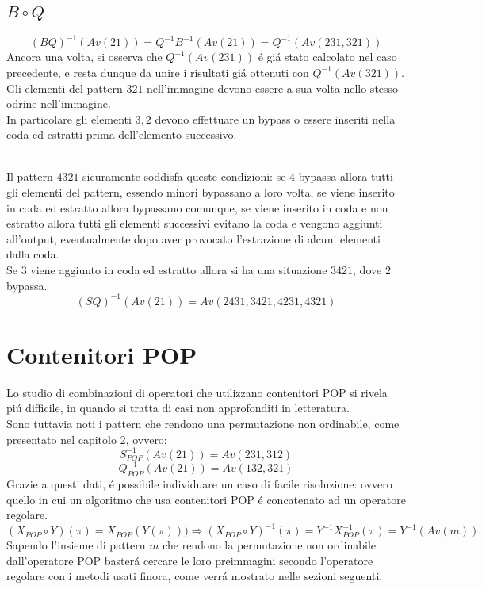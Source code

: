 \subsection*{$B\circ{Q}$}$$(BQ)^{-1}(Av(21))=Q^{-1}B^{-1}(Av(21))=Q^{-1}(Av(231,321))$$
Ancora una volta, si osserva che $Q^{-1}(Av(231))$ \'e gi\'a stato calcolato nel caso precedente, e resta dunque da unire i risultati gi\'a ottenuti con $Q^{-1}(Av(321))$.\\
Gli elementi del pattern $321$ nell'immagine devono essere a sua volta nello stesso odrine nell'immagine.\\
In particolare gli elementi $3,2$ devono effettuare un bypass o essere inseriti nella coda ed estratti prima dell'elemento successivo.\\\\
\begin{center}
\end{center}
Il pattern $4321$ sicuramente soddisfa queste condizioni: se $4$ bypassa allora tutti gli elementi del pattern, essendo minori bypassano a loro volta, se viene inserito in coda ed estratto allora bypassano comunque, se viene inserito in coda e non estratto allora tutti gli elementi successivi evitano la coda e vengono aggiunti all'output, eventualmente dopo aver provocato l'estrazione di alcuni elementi dalla coda.\\
Se $3$ viene aggiunto in coda ed estratto allora si ha una situazione $3421$, dove $2$ bypassa.\\
$$(SQ)^{-1}(Av(21))=Av(2431,3421,4231,4321)$$
\section*{Contenitori POP}
Lo studio di combinazioni di operatori che utilizzano contenitori POP si rivela pi\'u difficile, in quando si tratta di casi non approfonditi in letteratura.\\
Sono tuttavia noti i pattern che rendono una permutazione non ordinabile, come presentato nel capitolo 2, ovvero:
$$S_{POP}^{-1}(Av(21)) = Av(231,312)$$$$Q_{POP}^{-1}(Av(21))=Av(132,321)$$
Grazie a questi dati, \'e possibile individuare un caso di facile risoluzione: ovvero quello in cui un algoritmo che usa contenitori POP \'e concatenato ad un operatore regolare.
$$(X_{POP}\circ{Y})(\pi)= X_{POP}(Y(\pi)))\Rightarrow(X_{POP}\circ{Y})^{-1}(\pi) = Y^{-1}X_{POP}^{-1}(\pi)=Y^{-1}(Av(m))$$
Sapendo l'insieme di pattern $m$ che rendono la permutazione non ordinabile dall'operatore POP baster\'a cercare le loro preimmagini secondo l'operatore regolare con i metodi usati finora, come verr\'a mostrato nelle sezioni seguenti.
